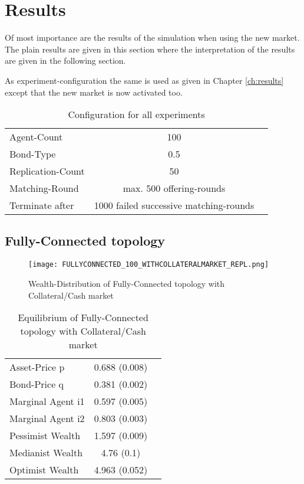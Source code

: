 \documentclass[Bachelorarbeit.tex]{subfiles}
\begin{document}
\section{Results}
Of most importance are the results of the simulation when using the new market. The plain results are given in this section where the interpretation of the results are given in the following section.

\medskip

As experiment-configuration the same is used as given in Chapter \ref{ch:results} except that the new market is now activated too.

\begin{table}[H]
	\centering
	\caption{Configuration for all experiments}
	\begin{tabular} { l c r }
		\hline
		Agent-Count & 100 \\
		Bond-Type & 0.5 \\
		Replication-Count & 50 \\
		Matching-Round & max. 500 offering-rounds \\
		Terminate after & 1000 failed successive matching-rounds \\
		\hline
	\end{tabular}
\end{table}

\subsection{Fully-Connected topology}

\begin{figure}[H]
	\centering
  \texttt{[image: FULLYCONNECTED\_100\_WITHCOLLATERALMARKET\_REPL.png]}
	\caption{Wealth-Distribution of Fully-Connected topology with Collateral/Cash market}
	\label{fig:wealth_FULLYCONNECTED_100_WITHCOLLATERALMARKET_REPL}
\end{figure}

\begin{table}[H]
	\caption{Equilibrium of Fully-Connected topology with Collateral/Cash market}
	\centering
	\begin{tabular} { l c r }
		\hline
		Asset-Price p & 0.688 (0.008) \\
		Bond-Price q & 0.381 (0.002) \\
		Marginal Agent i1 & 0.597 (0.005) \\
		Marginal Agent i2 & 0.803 (0.003) \\
		\hline
		Pessimist Wealth & 1.597 (0.009) \\
		Medianist Wealth & 4.76 (0.1) \\
		Optimist Wealth & 4.963 (0.052) \\
		\hline
	\end{tabular}
\end{table} 
\end{document}
